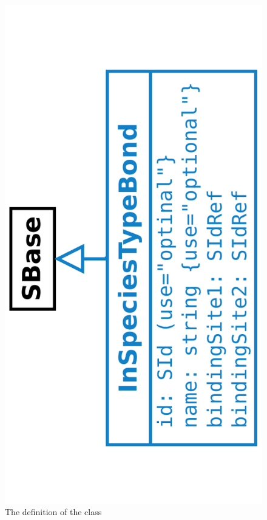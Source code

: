 \begin{figure}[htb]
  \begin{center}
\ifpdf
    \includegraphics[angle=-90, scale=0.27]{./figs/multi_006_InSpeciesTypeBond.pdf}
\fi
    \caption{The definition of the \InSpeciesTypeBond class}
  \label{fig:InSpeciesTypeBond}
  \end{center}
\end{figure}

